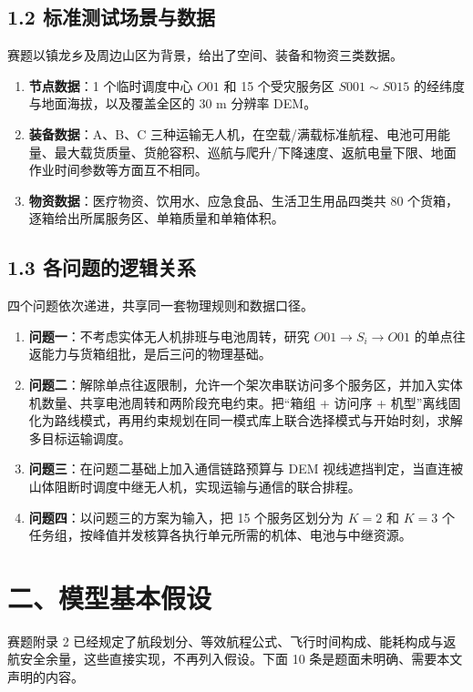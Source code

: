 \documentclass[withoutpreface,bwprint]{format}
\begin{document}
\subsection{1.2 标准测试场景与数据}
赛题以镇龙乡及周边山区为背景，给出了空间、装备和物资三类数据。

\begin{enumerate}[leftmargin=*]
    \item \textbf{节点数据}：1 个临时调度中心 $O01$ 和 15 个受灾服务区 $S001\sim S015$ 的经纬度与地面海拔，以及覆盖全区的 30 m 分辨率 DEM。
    \item \textbf{装备数据}：A、B、C 三种运输无人机，在空载/满载标准航程、电池可用能量、最大载货质量、货舱容积、巡航与爬升/下降速度、返航电量下限、地面作业时间参数等方面互不相同。
    \item \textbf{物资数据}：医疗物资、饮用水、应急食品、生活卫生用品四类共 80 个货箱，逐箱给出所属服务区、单箱质量和单箱体积。
\end{enumerate}

\subsection{1.3 各问题的逻辑关系}
四个问题依次递进，共享同一套物理规则和数据口径。

\begin{enumerate}[leftmargin=*]
    \item \textbf{问题一}：不考虑实体无人机排班与电池周转，研究 $O01 \to S_i \to O01$ 的单点往返能力与货箱组批，是后三问的物理基础。
    \item \textbf{问题二}：解除单点往返限制，允许一个架次串联访问多个服务区，并加入实体机数量、共享电池周转和两阶段充电约束。把“箱组 + 访问序 + 机型”离线固化为路线模式，再用约束规划在同一模式库上联合选择模式与开始时刻，求解多目标运输调度。
    \item \textbf{问题三}：在问题二基础上加入通信链路预算与 DEM 视线遮挡判定，当直连被山体阻断时调度中继无人机，实现运输与通信的联合排程。
    \item \textbf{问题四}：以问题三的方案为输入，把 15 个服务区划分为 $K=2$ 和 $K=3$ 个任务组，按峰值并发核算各执行单元所需的机体、电池与中继资源。
\end{enumerate}

\clearpage
\section{二、模型基本假设}

赛题附录 2 已经规定了航段划分、等效航程公式、飞行时间构成、能耗构成与返航安全余量，这些直接实现，不再列入假设。下面 10 条是题面未明确、需要本文声明的内容。
\end{document}
